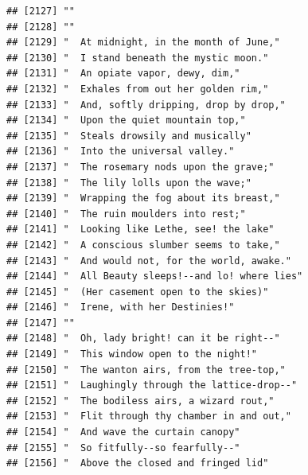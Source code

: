 \documentclass{article}\usepackage[]{graphicx}\usepackage[]{color}
\makeatletter
\newenvironment{kframe}{%
 \def\at@end@of@kframe{}%
 \ifinner\ifhmode%
  \def\at@end@of@kframe{\end{minipage}}%
  \begin{minipage}{\columnwidth}%
 \fi\fi%
 \def\FrameCommand##1{\hskip\@totalleftmargin \hskip-\fboxsep
 \colorbox{shadecolor}{##1}\hskip-\fboxsep
     \hskip-\linewidth \hskip-\@totalleftmargin \hskip\columnwidth}%
 \MakeFramed {\advance\hsize-\width
   \@totalleftmargin\z@ \linewidth\hsize
   \@setminipage}}%
 {\par\unskip\endMakeFramed%
 \at@end@of@kframe}
\newenvironment{knitrout}{}{} %
\makeatother
\begin{document}
\begin{knitrout}
\begin{kframe}
\begin{verbatim}
## [2127] ""                                                                            
## [2128] ""                                                                            
## [2129] "  At midnight, in the month of June,"                                        
## [2130] "  I stand beneath the mystic moon."                                          
## [2131] "  An opiate vapor, dewy, dim,"                                               
## [2132] "  Exhales from out her golden rim,"                                          
## [2133] "  And, softly dripping, drop by drop,"                                       
## [2134] "  Upon the quiet mountain top,"                                              
## [2135] "  Steals drowsily and musically"                                             
## [2136] "  Into the universal valley."                                                
## [2137] "  The rosemary nods upon the grave;"                                         
## [2138] "  The lily lolls upon the wave;"                                             
## [2139] "  Wrapping the fog about its breast,"                                        
## [2140] "  The ruin moulders into rest;"                                              
## [2141] "  Looking like Lethe, see! the lake"                                         
## [2142] "  A conscious slumber seems to take,"                                        
## [2143] "  And would not, for the world, awake."                                      
## [2144] "  All Beauty sleeps!--and lo! where lies"                                    
## [2145] "  (Her casement open to the skies)"                                          
## [2146] "  Irene, with her Destinies!"                                                
## [2147] ""                                                                            
## [2148] "  Oh, lady bright! can it be right--"                                        
## [2149] "  This window open to the night!"                                            
## [2150] "  The wanton airs, from the tree-top,"                                       
## [2151] "  Laughingly through the lattice-drop--"                                     
## [2152] "  The bodiless airs, a wizard rout,"                                         
## [2153] "  Flit through thy chamber in and out,"                                      
## [2154] "  And wave the curtain canopy"                                               
## [2155] "  So fitfully--so fearfully--"                                               
## [2156] "  Above the closed and fringed lid"                                          

\end{verbatim}
\end{kframe}
\end{knitrout}
\end{document}
